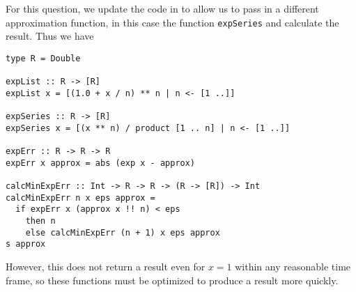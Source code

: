
For this question, we update the code in  to allow us
to pass in a different approximation function, in this case the function \verb|expSeries|
and calculate the result. Thus we have
\scriptsize\begin{verbatim}
type R = Double

expList :: R -> [R]
expList x = [(1.0 + x / n) ** n | n <- [1 ..]]

expSeries :: R -> [R]
expSeries x = [(x ** n) / product [1 .. n] | n <- [1 ..]]

expErr :: R -> R -> R
expErr x approx = abs (exp x - approx)

calcMinExpErr :: Int -> R -> R -> (R -> [R]) -> Int
calcMinExpErr n x eps approx =
  if expErr x (approx x !! n) < eps
    then n
    else calcMinExpErr (n + 1) x eps approx
s approx
\end{verbatim}\normalsize
However, this does not return a result even for $x = 1$ within any reasonable time frame,
so these functions must be optimized to produce a result more quickly.
